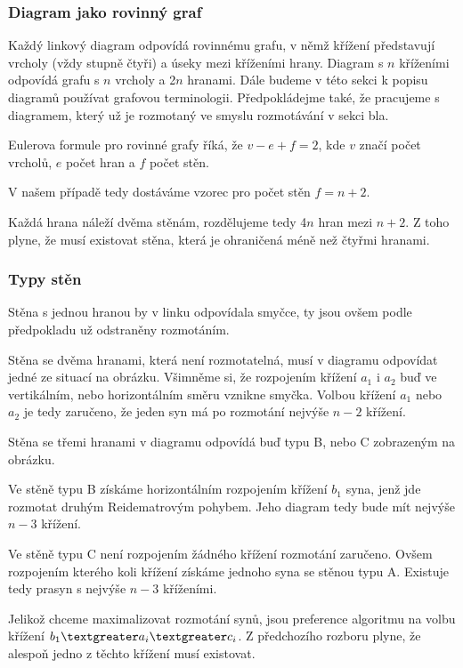 \subsubsection{Diagram jako rovinný graf}
Každý linkový diagram odpovídá rovinnému grafu, v němž křížení představují vrcholy (vždy stupně čtyři) a úseky mezi kříženími hrany. Diagram s $n$ kříženími odpovídá grafu s $n$ vrcholy a 2$n$ hranami.
Dále budeme v této sekci k popisu diagramů používat grafovou terminologii. Předpokládejme také, že pracujeme s diagramem, který už je rozmotaný ve smyslu rozmotávání v sekci bla.

Eulerova formule pro rovinné grafy říká, že $v - e +f = 2$, kde $v$ značí počet vrcholů, $e$ počet hran a $f$ počet stěn.

V našem případě tedy dostáváme vzorec pro počet stěn $f = n+2$.

Každá hrana náleží dvěma stěnám, rozdělujeme tedy 4$n$ hran mezi $n+2$. Z toho plyne, že musí existovat stěna, která je ohraničená méně než čtyřmi hranami.

\subsubsection{Typy stěn}

Stěna s jednou hranou by v linku odpovídala smyčce, ty jsou ovšem podle předpokladu už odstraněny rozmotáním.

Stěna se dvěma hranami, která není rozmotatelná, musí v diagramu odpovídat jedné ze situací na obrázku. Všimněme si, že rozpojením křížení $a_1$ i $a_2$ buď ve vertikálním, nebo horizontálním směru vznikne smyčka. Volbou křížení $a_1$ nebo $a_2$ je tedy zaručeno, že jeden syn má po rozmotání nejvýše $n-2$ křížení.

Stěna se třemi hranami v diagramu odpovídá buď typu B, nebo C zobrazeným na obrázku.

Ve stěně typu B získáme horizontálním rozpojením křížení $b_1$ syna, jenž jde rozmotat druhým Reidematrovým pohybem. Jeho diagram tedy bude mít nejvýše $n-3$ křížení.

Ve stěně typu C není rozpojením žádného křížení rozmotání zaručeno. Ovšem rozpojením kterého koli křížení získáme jednoho syna se stěnou typu A. Existuje tedy prasyn s nejvýše $n-3$ kříženími.

Jelikož chceme maximalizovat rozmotání synů, jsou preference algoritmu na volbu křížení $b_1 \textgreater a_i \textgreater c_i$. Z předchozího rozboru plyne, že alespoň jedno z těchto křížení musí existovat.

